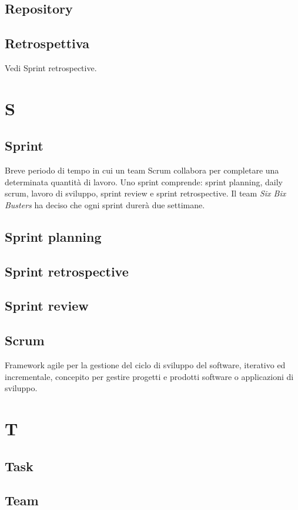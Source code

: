     \subsection{Repository}
    \subsection{Retrospettiva}
    Vedi Sprint retrospective.
\section{S}
    \subsection{Sprint}
    Breve periodo di tempo in cui un team Scrum collabora per completare 
    una determinata quantità di lavoro. Uno sprint comprende:  
    sprint planning, daily scrum, lavoro di sviluppo, 
    sprint review e sprint retrospective. Il team \textit{Six Bix Busters} ha 
    deciso che ogni sprint durerà due settimane.   
    \subsection{Sprint planning}
    \subsection{Sprint retrospective}
    \subsection{Sprint review} 
    \subsection{Scrum}
    Framework agile per la gestione del ciclo di sviluppo del software, 
    iterativo ed incrementale, concepito per gestire progetti e prodotti software 
    o applicazioni di sviluppo.

\section{T}
    \subsection{Task}
    \subsection{Team}
